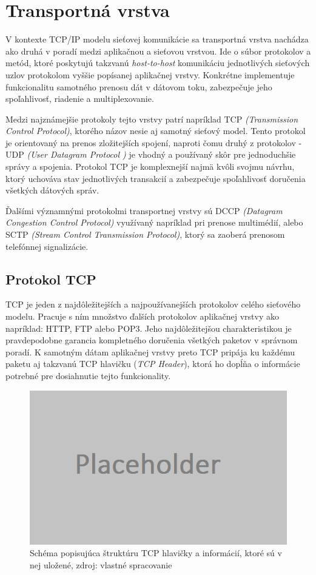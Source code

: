 \documentclass[
  digital, %
  table,   %
  lof,     %
  nolot,   %
  nocover
]{fithesis3}
\begin{document}
\section{Transportná vrstva}
V kontexte TCP/IP modelu sieťovej komunikácie sa transportná vrstva nachádza
ako druhá v poradí medzi aplikačnou a sieťovou vrstvou. Ide o súbor protokolov
a metód, ktoré poskytujú takzvanú \textit{host-to-host} komunikáciu
jednotlivých sieťových uzlov protokolom vyššie popísanej aplikačnej vrstvy.
Konkrétne implementuje funkcionalitu samotného prenosu dát v dátovom toku,
zabezpečuje jeho spoľahlivosť, riadenie a multiplexovanie. 

Medzi najznámejšie protokoly tejto vrstvy patrí napríklad TCP
\textit{(Transmission Control Protocol)}, ktorého názov nesie aj samotný
sieťový model. Tento protokol je orientovaný na prenos zložitejších spojení,
naproti čomu druhý z protokolov - UDP \textit{(User Datagram Protocol )} je
vhodný a používaný skôr pre jednoduchšie správy a spojenia. Protokol TCP je
komplexnejší najmä kvôli svojmu návrhu, ktorý uchováva stav jednotlivých
transakcií a zabezpečuje spoľahlivosť doručenia všetkých dátových správ. 

Ďalšími
významnými protokolmi transportnej vrstvy sú DCCP
\textit{(Datagram Congestion Control Protocol)} využívaný napríklad pri prenose
multimédií, alebo SCTP \textit{(Stream Control Transmission Protocol)}, ktorý
sa zaoberá prenosom telefónnej signalizácie.

\subsection{Protokol TCP}
TCP je jeden z najdôležitejších a najpoužívanejších protokolov celého sieťového
modelu. Pracuje s ním množstvo ďalších protokolov aplikačnej vrstvy ako
napríklad: HTTP, FTP alebo POP3. Jeho najdôležitejšou charakteristikou je
pravdepodobne garancia kompletného doručenia všetkých paketov v správnom
poradí. K samotným dátam aplikačnej vrstvy preto TCP pripája ku každému paketu
aj takzvanú TCP hlavičku (\textit{TCP Header}), ktorá ho dopĺňa o informácie
potrebné pre dosiahnutie tejto funkcionality.

\begin{figure}[h]
  \centering
    \includegraphics[width=.80\textwidth]{images/net-tcp-head.png}
  \caption{Schéma popisujúca štruktúru TCP hlavičky a informácií, ktoré sú v
  nej uložené, zdroj: vlastné spracovanie}
  \label{fig:net-tcp-head}
\end{figure}
\end{document}
